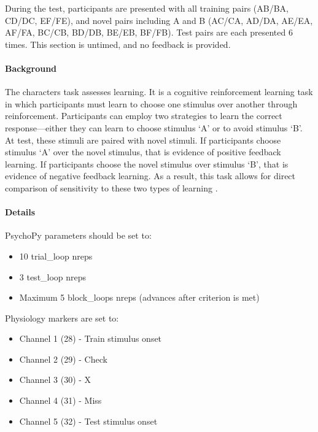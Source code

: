 \documentclass[]{book}
\providecommand{\tightlist}{%
  \setlength{\itemsep}{0pt}\setlength{\parskip}{0pt}}
\let\oldparagraph\paragraph
\renewcommand{\paragraph}[1]{\oldparagraph{#1}\mbox{}}
\begin{document}
During the test, participants are presented with all training pairs (AB/BA, CD/DC, EF/FE), and novel pairs including A and B (AC/CA, AD/DA, AE/EA, AF/FA, BC/CB, BD/DB, BE/EB, BF/FB). Test pairs are each presented 6 times. This section is untimed, and no feedback is provided.

\hypertarget{background-2}{%
\paragraph{Background}\label{background-2}}

The characters task assesses learning. It is a cognitive reinforcement learning task in which participants must learn to choose one stimulus over another through reinforcement. Participants can employ two strategies to learn the correct response---either they can learn to choose stimulus `A' or to avoid stimulus `B'. At test, these stimuli are paired with novel stimuli. If participants choose stimulus `A' over the novel stimulus, that is evidence of positive feedback learning. If participants choose the novel stimulus over stimulus `B', that is evidence of negative feedback learning. As a result, this task allows for direct comparison of sensitivity to these two types of learning \citep{frank_2004}.

\hypertarget{details-3}{%
\paragraph{Details}\label{details-3}}

PsychoPy parameters should be set to:

\begin{itemize}
\tightlist
\item
  10 trial\_loop nreps
\item
  3 test\_loop nreps
\item
  Maximum 5 block\_loops nreps (advances after criterion is met)
\end{itemize}

Physiology markers are set to:

\begin{itemize}
\tightlist
\item
  Channel 1 (28) - Train stimulus onset
\item
  Channel 2 (29) - Check
\item
  Channel 3 (30) - X
\item
  Channel 4 (31) - Miss
\item
  Channel 5 (32) - Test stimulus onset
\end{itemize}
\end{document}
